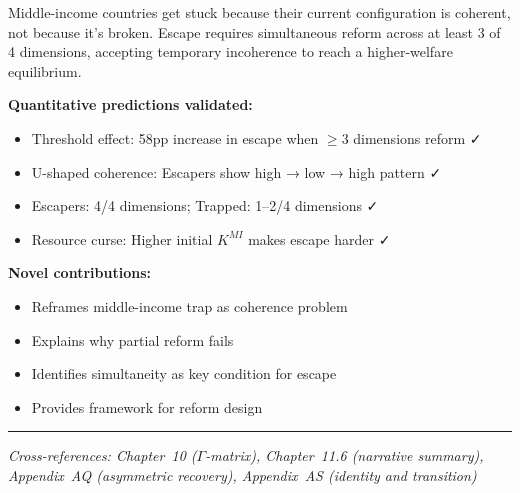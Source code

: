 \begin{tcolorbox}[colback=blue!5!white, colframe=blue!75!black, title=Prediction 6: Coherence Trap (Summary)]
Middle-income countries get stuck because their current configuration is 
coherent, not because it's broken. Escape requires simultaneous reform 
across at least 3 of 4 dimensions, accepting temporary incoherence to 
reach a higher-welfare equilibrium.

\textbf{Quantitative predictions validated:}
\begin{itemize}
    \item Threshold effect: 58pp increase in escape when $\geq 3$ dimensions reform ✓
    \item U-shaped coherence: Escapers show high → low → high pattern ✓
    \item Escapers: 4/4 dimensions; Trapped: 1--2/4 dimensions ✓
    \item Resource curse: Higher initial $K^{MI}$ makes escape harder ✓
\end{itemize}

\textbf{Novel contributions:}
\begin{itemize}
    \item Reframes middle-income trap as coherence problem
    \item Explains why partial reform fails
    \item Identifies simultaneity as key condition for escape
    \item Provides framework for reform design
\end{itemize}
\end{tcolorbox}

\vspace{1em}
\hrule
\vspace{0.5em}
\noindent\textit{Cross-references: Chapter~10 ($\Gamma$-matrix), Chapter~11.6 (narrative summary), 
Appendix~AQ (asymmetric recovery), Appendix~AS (identity and transition)}

